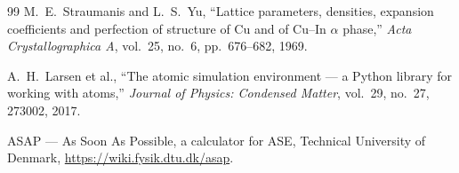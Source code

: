 \documentclass[11pt,a4paper]{article}
\numberwithin{equation}{section}
\theoremstyle{remark}
\begin{document}
\begin{thebibliography}{99}
M.~E.~Straumanis and L.~S.~Yu,
``Lattice parameters, densities, expansion coefficients and perfection of structure of Cu and of
Cu--In $\alpha$ phase,''
\textit{Acta Crystallographica A},
vol.~25, no.~6, pp.~676--682, 1969.

A.~H.~Larsen et al.,
``The atomic simulation environment --- a Python library for working with atoms,''
\textit{Journal of Physics: Condensed Matter},
vol.~29, no.~27, 273002, 2017.

ASAP --- As Soon As Possible, a calculator for ASE,
Technical University of Denmark,
\url{https://wiki.fysik.dtu.dk/asap}.

\end{thebibliography}
\end{document}
